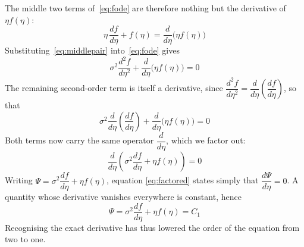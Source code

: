 \documentclass[a4paper,12pt]{article}
\numberwithin{equation}{section}
\begin{document}
The middle two terms of~\eqref{eq:fode} are therefore nothing but the derivative
of $\eta f(\eta)$:
\begin{equation}\label{eq:middlepair}
  \eta\,\frac{df}{d\eta} + f(\eta) = \frac{d}{d\eta}\big(\eta f(\eta)\big) 
\end{equation}
Substituting~\eqref{eq:middlepair} into~\eqref{eq:fode} gives
\begin{equation}\label{eq:asderiv}
  \sigma^{2}\frac{d^{2}f}{d\eta^{2}}
    + \frac{d}{d\eta}\big(\eta f(\eta)\big) = 0 
\end{equation}
The remaining second-order term is itself a derivative, since
$\dfrac{d^{2}f}{d\eta^{2}} = \dfrac{d}{d\eta}\!\left(\dfrac{df}{d\eta}\right)$, so
that
\begin{equation}\label{eq:bothderiv}
  \sigma^{2}\frac{d}{d\eta}\!\left(\frac{df}{d\eta}\right)
    + \frac{d}{d\eta}\big(\eta f(\eta)\big) = 0 
\end{equation}
Both terms now carry the same operator $\dfrac{d}{d\eta}$, which we factor out:
\begin{equation}\label{eq:factored}
  \frac{d}{d\eta}\!\left(\sigma^{2}\frac{df}{d\eta} + \eta f(\eta)\right) = 0 
\end{equation}
Writing $\Psi = \sigma^{2}\dfrac{df}{d\eta} + \eta f(\eta)$, equation
\eqref{eq:factored} states simply that $\dfrac{d\Psi}{d\eta} = 0$. A quantity
whose derivative vanishes everywhere is constant, hence
\begin{equation}\label{eq:firstorder}
  \Psi = \sigma^{2}\frac{df}{d\eta} + \eta f(\eta) = C_{1} 
\end{equation}
Recognising the exact derivative has thus lowered the order of the equation from
two to one.
\end{document}
